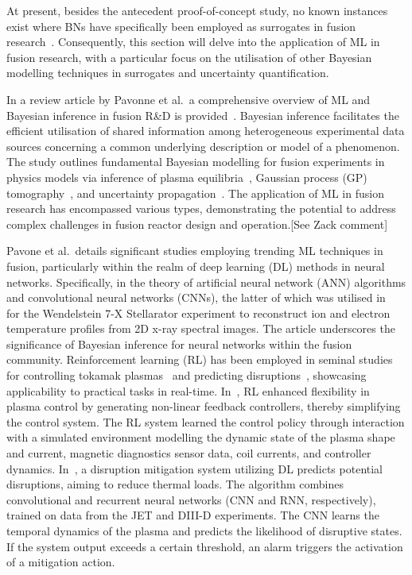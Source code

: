 \documentclass[journal]{IEEEtran}
\begin{document}
At present, besides the antecedent proof-of-concept study, no known instances exist where BNs have specifically been employed as surrogates in fusion research~\cite{Griffiths2024}. Consequently, this section will delve into the application of ML in fusion research, with a particular focus on the utilisation of other Bayesian modelling techniques in surrogates and uncertainty quantification.

In a review article by Pavonne et al.\ a comprehensive overview of ML and Bayesian inference in fusion R\&D is provided~\cite{Pavone2023}. Bayesian inference facilitates the efficient utilisation of shared information among heterogeneous experimental data sources concerning a common underlying description or model of a phenomenon. The study outlines fundamental Bayesian modelling for fusion experiments in physics models via inference of plasma equilibria~\cite{Svensson2003, Svensson2004}, Gaussian process (GP) tomography~\cite{Svensson2011}, and uncertainty propagation~\cite{Fischer2020, Fischer2010}. The application of ML in fusion research has encompassed various types, demonstrating the potential to address complex challenges in fusion reactor design and operation.[See Zack comment]

Pavone et al.~details significant studies employing trending ML techniques in fusion, particularly within the realm of deep learning (DL) methods in neural networks. Specifically, in the theory of artificial neural network (ANN) algorithms and convolutional neural networks (CNNs), the latter of which was utilised in~\cite{Pavone2019} for the Wendelstein 7-X Stellarator experiment to reconstruct ion and electron temperature profiles from 2D x-ray spectral images. The article underscores the significance of Bayesian inference for neural networks within the fusion community. Reinforcement learning (RL) has been employed in seminal studies for controlling tokamak plasmas~\cite{Degrave2022} and predicting disruptions~\cite{Kates2019}, showcasing applicability to practical tasks in real-time. In~\cite{Degrave2022}, RL enhanced flexibility in plasma control by generating non-linear feedback controllers, thereby simplifying the control system. The RL system learned the control policy through interaction with a simulated environment modelling the dynamic state of the plasma shape and current, magnetic diagnostics sensor data, coil currents, and controller dynamics. In~\cite{Kates2019}, a disruption mitigation system utilizing DL predicts potential disruptions, aiming to reduce thermal loads. The algorithm combines convolutional and recurrent neural networks (CNN and RNN, respectively), trained on data from the JET and DIII-D experiments. The CNN learns the temporal dynamics of the plasma and predicts the likelihood of disruptive states. If the system output exceeds a certain threshold, an alarm triggers the activation of a mitigation action. 
\end{document}

